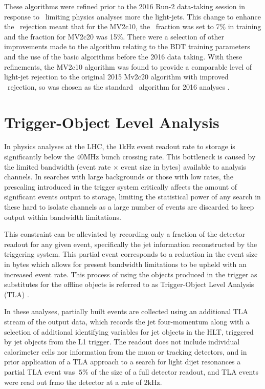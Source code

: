 	These algorithms were refined prior to the 2016 Run-2 data-taking session in response to \cjets\ limiting physics analyses more the light-jets. This change  to enhance the \cjet\ rejection meant that for the MV2c10, the \cjet\ fraction was set to 7\% in training and the fraction for MV2c20 was 15\%. There were a selection of other improvements made to the algorithm relating to the BDT training parameters and the use of the basic algorithms before the 2016 data taking. With these refinements, the MV2c10 algorithm was found to provide a comparable level of light-jet rejection to the original 2015 Mv2c20 algorithm with improved \cjet\ rejection, so was chosen as the standard \btag\ algorithm for 2016 analyses \cite{btagOptimisation}.


\section{Trigger-Object Level Analysis}
\label{t:tla}

	In physics analyses at the LHC, the $1$kHz event readout rate to storage is significantly below the $40$MHz bunch crossing rate. This bottleneck is caused by the limited bandwidth (event rate $\times$ event size in bytes) available to analysis channels. In searches with large backgrounds or those with low rates, the prescaling introduced in the trigger system critically affects the amount of significant events output to storage, limiting the statistical power of any search in these hard to isolate channels as a large number of events are discarded to keep output within bandwidth limitations.

	This constraint can be alleviated by recording only a fraction of the detector readout for any given event, specifically the jet information reconstructed by the triggering system. This partial event corresponds to a reduction in the event size in bytes which allows for present bandwidth limitations to be upheld with an increased event rate. This process of using the objects produced in the trigger as substitutes for the offline objects is referred to as Trigger-Object Level Analysis (TLA) \cite{tla}.

	In these analyses, partially built events are collected using an additional TLA stream of the output data, which records the jet four-momentum along with a selection of additional identifying variables for jet objects in the HLT, triggered by jet objects from the L1 trigger. The readout does not include individual calorimeter cells nor information from the muon or tracking detectors, and in prior application of a TLA approach to a search for light dijet resonances \cite{tla} a partial TLA event was $~5\%$ of the size of a full detector readout, and TLA events were read out frmo the detector at a rate of $2$kHz.

\endinput

